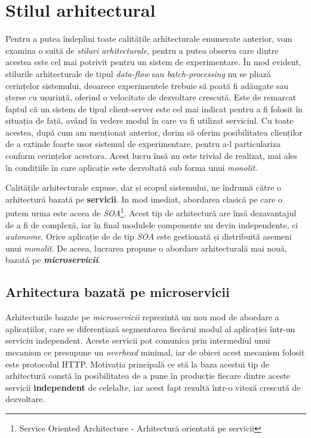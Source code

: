 \section{Stilul arhitectural}

Pentru a putea îndeplini toate calitățile arhitecturale enumerate anterior, vom examina o suită de \textit{stiluri arhitecturale}, pentru a putea observa care dintre acestea este cel mai potrivit pentru un sistem de experimentare. În mod evident, stilurile arhitecturale de tipul \textit{data-flow} sau \textit{batch-processing} nu se pliază cerințelor sistemului, deoarece experimentele trebuie să poată fi adăugate sau șterse cu ușurință, oferind o velocitate de dezvoltare crescută. Este de remarcat faptul că un sistem de tipul client-server este cel mai indicat pentru a fi folosit în situația de față, având în vedere modul în care va fi utilizat serviciul. Cu toate acestea, după cum am menționat anterior, dorim să oferim posibilitatea clienților de a extinde foarte ușor sistemul de experimentare, pentru a-l particulariza conform cerințelor acestora. Acest lucru însă nu este trivial de realizat, mai ales în condițiile în care aplicație este dezvoltată sub forma unui \textit{monolit}.

Calitățile arhitecturale expuse, dar și scopul sistemului, ne îndrumă către o arhitectură bazată pe \textbf{servicii\textit{}}. In mod imediat, abordarea clasică pe care o putem urma este aceea de \textit{SOA}\footnote{Service Oriented Architecture - Arhitectură orientată pe servicii}. Acest tip de arhitectură are însă dezavantajul de a fi de complexă, iar în final modulele componente nu devin independente, ci \textit{autonome}. Orice aplicație de de tip \textit{SOA} este gestionată și distribuită asemeni unui \textit{monolit}. De aceea, lucrarea propune o abordare arhitecturală mai nouă, bazată pe \textbf{\textit{microservicii}}.\cite{buildingmicro} 

\subsection{Arhitectura bazată pe microservicii}

Arhitecturile bazate pe \textit{microservicii} reprezintă un nou mod de abordare a aplicațiilor, care se diferențiază segmentarea fiecărui modul al aplicației într-un serviciu independent. Aceste servicii pot comunica prin intermediul unui mecanism ce presupune un \textit{overhead} minimal, iar de obicei acest mecanism folosit este protocolul HTTP\cite{onmicro}. Motivația principală ce stă la baza acestui tip de arhitectură constă în posibilitatea de a pune în producție fiecare dintre aceste servicii \textbf{independent} de celelalte, iar acest fapt rezultă într-o viteză crescută de dezvoltare.

